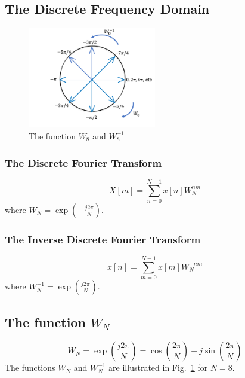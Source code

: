 
\subsection*{The Discrete Frequency Domain}


    \begin{figure}[htb]
        \begin{center}
            \includegraphics[width=0.5\textwidth]{formula-sheets/w_wheel.png}
            \caption{\label{fig:w_wheel} The function $W_8$ and $W_8^{-1}$}
        \end{center}
    \end{figure}



\subsubsection*{The Discrete Fourier Transform}

$$
X[m] = \sum_{n=0}^{N-1} x[n] W_N^{nm}
$$
where $W_N = \exp\left(-\frac{j2\pi}{N}\right)$.

\subsubsection*{The Inverse Discrete Fourier Transform}

$$
x[n] = \sum_{m=0}^{N-1}  x[m]W_N^{-nm}
$$
where $W_N^{-1}=\exp\left(\frac{j2\pi}{N}\right)$.

\subsection*{The function $W_N$}

$$
W_N = \exp\left(\frac{j2\pi}{N}\right) %
     = \cos\left(\frac{2\pi}{N}\right)+j\sin\left(\frac{2\pi}{N}\right)
$$
The functions $W_N$ and $W_N^{-1}$ are illustrated in Fig.~\ref{fig:w_wheel} for $N = 8$.

\endinput

